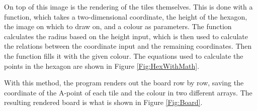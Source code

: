 On top of this image is the rendering of the tiles themselves. This is done with a function, which takes a two-dimensional coordinate, the height of the hexagon, the image on which to draw on, and a colour as parameters. The function calculates the radius based on the height input, which is then used to calculate the relations between the coordinate input and the remaining coordinates. Then the function fills it with the given colour. The equations used to calculate the points in the hexagon are shown in Figure \ref{Fig:HexWithMath}.

With this method, the program renders out the board row by row, saving the coordinate of the A-point of each tile and the colour in two different arrays. The resulting rendered board is what is shown in Figure \ref{Fig:Board}.